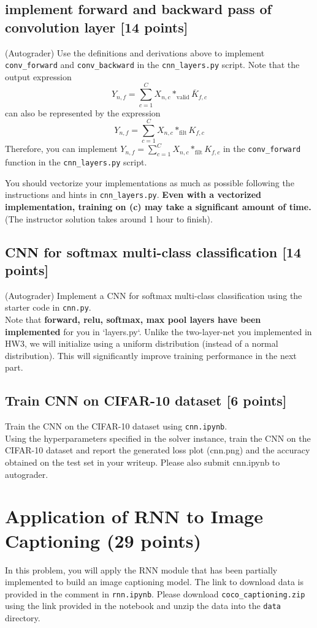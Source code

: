 \documentclass[lang=cn,11pt]{elegantbook}
\begin{document}
\subsection{implement forward and backward pass of convolution layer [14 points]}
(Autograder) Use the definitions and derivations above to implement \texttt{conv\_forward} and \texttt{conv\_backward} in the \texttt{cnn\_layers.py} script.
Note that the output expression  \[
Y_{n,f} = \sum_{c=1}^{C} X_{n,c} *_{\text{valid}} \overline{K}_{f,c}
\]
can also be represented by the expression \[
Y_{n,f} = \sum_{c=1}^{C} X_{n,c} *_{\text{filt}} K_{f,c}
\]
Therefore, you can implement \(Y_{n,f} = \sum_{c=1}^{C} X_{n,c} *_{\text{filt}} K_{f,c}\) in the \texttt{conv\_forward} function in the \texttt{cnn\_layers.py} script.

You should vectorize your implementations as much as possible following the instructions and hints in \texttt{cnn\_layers.py}. \textbf{Even with a vectorized implementation, training on (c) may take a significant amount of time.} (The instructor solution takes around 1 hour to finish).

\subsection{CNN for softmax multi-class classification [14 points]}
(Autograder) Implement a CNN for softmax multi-class classification using the starter code in \texttt{cnn.py}. \\Note that \textbf{forward, relu, softmax, max pool layers have been implemented} for you in `layers.py`. Unlike the two-layer-net you implemented in HW3, we will initialize using a uniform distribution (instead of a normal distribution). This will significantly improve training performance in the next part.

\subsection{Train CNN on CIFAR-10 dataset [6 points]}
Train the CNN on the CIFAR-10 dataset using \texttt{cnn.ipynb}.\\
Using the hyperparameters specified in the solver instance, train the CNN on the CIFAR-10 dataset and report the generated loss plot (cnn.png) and the accuracy obtained on the test set in your writeup. Please also submit cnn.ipynb to autograder.




\section{Application of RNN to Image Captioning (29 points)}
In this problem, you will apply the RNN module that has been partially implemented to build an image captioning model. The link to download data is provided in the comment in \texttt{rnn.ipynb}. Please download \texttt{coco\_captioning.zip} using the link provided in the notebook and unzip the data into the \texttt{data} directory.
\end{document}
